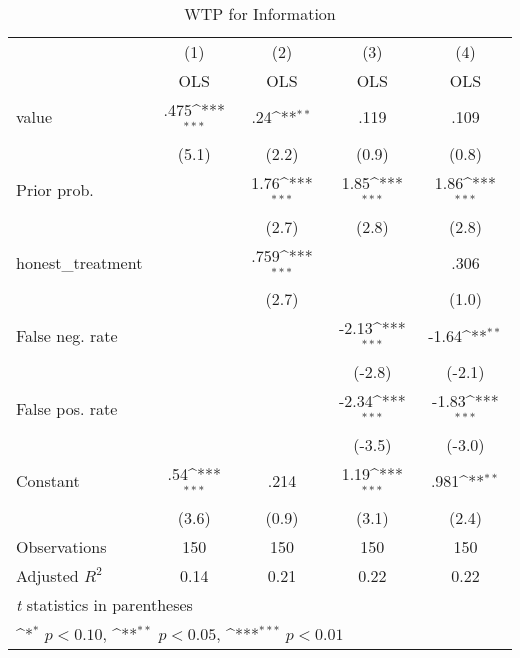 \begin{table}[htbp]\centering
\def\sym#1{\ifmmode^{#1}\else\(^{#1}\)\fi}
\caption{WTP for Information}
\begin{tabular}{l*{4}{c}}
\hline\hline
                &\multicolumn{1}{c}{(1)}&\multicolumn{1}{c}{(2)}&\multicolumn{1}{c}{(3)}&\multicolumn{1}{c}{(4)}\\
                &\multicolumn{1}{c}{OLS}&\multicolumn{1}{c}{OLS}&\multicolumn{1}{c}{OLS}&\multicolumn{1}{c}{OLS}\\
\hline
value           &     .475\sym{***}&      .24\sym{**} &     .119         &     .109         \\
                &    (5.1)         &    (2.2)         &    (0.9)         &    (0.8)         \\
Prior prob.     &                  &     1.76\sym{***}&     1.85\sym{***}&     1.86\sym{***}\\
                &                  &    (2.7)         &    (2.8)         &    (2.8)         \\
honest\_treatment&                  &     .759\sym{***}&                  &     .306         \\
                &                  &    (2.7)         &                  &    (1.0)         \\
False neg. rate &                  &                  &    -2.13\sym{***}&    -1.64\sym{**} \\
                &                  &                  &   (-2.8)         &   (-2.1)         \\
False pos. rate &                  &                  &    -2.34\sym{***}&    -1.83\sym{***}\\
                &                  &                  &   (-3.5)         &   (-3.0)         \\
Constant        &      .54\sym{***}&     .214         &     1.19\sym{***}&     .981\sym{**} \\
                &    (3.6)         &    (0.9)         &    (3.1)         &    (2.4)         \\
\hline
Observations    &      150         &      150         &      150         &      150         \\
Adjusted \(R^{2}\)&     0.14         &     0.21         &     0.22         &     0.22         \\
\hline\hline
\multicolumn{5}{l}{\footnotesize \textit{t} statistics in parentheses}\\
\multicolumn{5}{l}{\footnotesize \sym{*} \(p<0.10\), \sym{**} \(p<0.05\), \sym{***} \(p<0.01\)}\\
\end{tabular}
\end{table}
